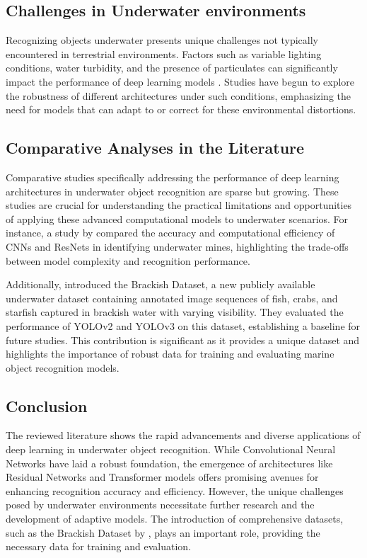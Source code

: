 \subsection{Challenges in Underwater environments}
Recognizing objects underwater presents unique challenges not typically
encountered in terrestrial environments.
Factors such as variable lighting conditions, water turbidity, and the
presence of particulates can significantly impact the performance of deep
learning models \parencite{liUnderwaterImageEnhancement2020}.
Studies have begun to explore the robustness of different architectures under
such conditions, emphasizing the need for models that can adapt to or correct
for these environmental distortions.

\subsection{Comparative Analyses in the Literature}
Comparative studies specifically addressing the performance of deep learning
architectures in underwater object recognition are sparse but growing.
These studies are crucial for understanding the practical limitations and
opportunities of applying these advanced computational models to underwater
scenarios.
For instance, a study by \Textcite{tengUnderwaterTargetRecognition2020}
compared the accuracy and computational efficiency of CNNs
and ResNets in identifying underwater mines,
highlighting the trade-offs between model complexity and recognition
performance.

Additionally, \Textcite{pedersenDetectionMarineAnimals2019} introduced the Brackish Dataset,
a new publicly available underwater dataset containing annotated image sequences of fish,
crabs, and starfish captured in brackish water with varying visibility.
They evaluated the performance of YOLOv2 and YOLOv3 on this dataset,
establishing a baseline for future studies. 
This contribution is significant as it provides a unique dataset and highlights
the importance of robust data for training and evaluating marine object recognition models.

\subsection{Conclusion}
The reviewed literature shows the rapid advancements and diverse applications
of deep learning in underwater object recognition.
While Convolutional Neural Networks have laid a robust foundation,
the emergence of architectures like Residual Networks and Transformer models offers
promising avenues for enhancing recognition accuracy and efficiency.
However, the unique challenges posed by underwater environments necessitate further
research and the development of adaptive models.
The introduction of comprehensive datasets,
such as the Brackish Dataset by \Textcite{pedersenDetectionMarineAnimals2019}, plays
an important role, providing the necessary data for training and evaluation.